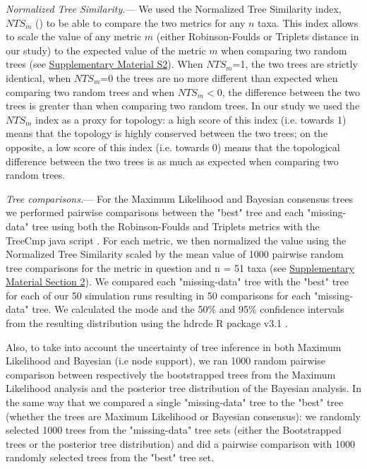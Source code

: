 \documentclass[12pt,letterpaper]{article}
\renewcommand{\subsubsection}[1]{%
\vspace{2ex}
\noindent
\textit{#1.}---}
\begin{document}
\subsubsection{Normalized Tree Similarity}
We used the Normalized Tree Similarity index, $NTS_m$ (\citealp{Bogdanowicz2012}) to be able to compare the two metrics for any $n$ taxa. This index allows to scale the value of any metric $m$ (either Robinson-Foulds or Triplets distance in our study) to the expected value of the metric $m$ when comparing two random trees (see \hyperref[SupplementaryMaterial]{Supplementary Material S2}). When $NTS_m$=1, the two trees are strictly identical, when $NTS_m$=0 the trees are no more different than expected when comparing two random trees and when $NTS_m$$<$0, the difference between the two trees is greater than when comparing two random trees. In our study we used the $NTS_m$ index as a proxy for topology: a high score of this index (i.e. towards 1) means that the topology is highly conserved between the two trees; on the opposite, a low score of this index (i.e. towards 0) means that the topological difference between the two trees is as much as expected when comparing two random trees.

\subsubsection{Tree comparisons}
\label{tree_comparisons}
For the Maximum Likelihood and Bayesian consensus trees we performed pairwise comparisons between the "best" tree and each "missing-data" tree using both the Robinson-Foulds and Triplets metrics with the TreeCmp java script \citep{Bogdanowicz2012}. For each metric, we then normalized the value using the Normalized Tree Similarity scaled by the mean value of 1000 pairwise random tree comparisons for the metric in question and n = 51 taxa (see \hyperref[SupplementaryMaterial]{Supplementary Material Section 2}). %
We compared each "missing-data" tree with the "best" tree for each of our 50 simulation runs resulting in 50 comparisons for each "missing-data" tree. We calculated the mode and the 50\% and 95\% confidence intervals from the resulting distribution using the hdrcde R package v3.1 \citep{hdrcde}.

Also, to take into account the uncertainty of tree inference in both Maximum Likelihood and Bayesian (i.e node support), we ran 1000 random pairwise comparison between respectively the bootstrapped trees from the Maximum Likelihood analysis and the posterior tree distribution of the Bayesian analysis. In the same way that we compared a single "missing-data" tree to the "best" tree (whether the trees are Maximum Likelihood or Bayesian consensus): we randomly selected 1000 trees from the "missing-data" tree sets (either the Bootstrapped trees or the posterior tree distribution) and did a pairwise comparison with 1000 randomly selected trees from the "best" tree set.
\end{document}

